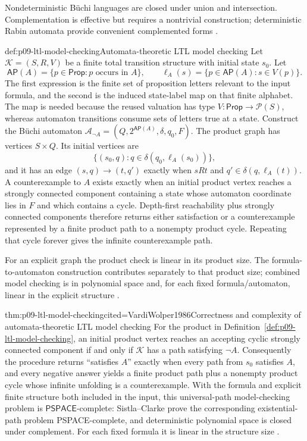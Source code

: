Nondeterministic B\"uchi languages are closed under union and intersection.
Complementation is effective but requires a nontrivial construction;
deterministic Rabin automata provide convenient complemented forms
\cite{Safra1995Extended,Thomas1996Report}.

\begin{hbmethod}{def:p09-ltl-model-checking}{Automata-theoretic LTL model checking}
Let \(\mathcal K=(S,R,V)\) be a finite total transition structure with initial
state \(s_0\).  Let
\[
 \mathsf{AP}(A)=\{p\in\mathsf{Prop}:p\text{ occurs in }A\},
 \qquad
 \ell_A(s)=\{p\in\mathsf{AP}(A):s\in V(p)\}.
\]
The first expression is the finite set of proposition letters relevant to the
input formula, and the second is the induced state-label map on that finite
alphabet.  The map is needed because the reused valuation has type
\(V:\mathsf{Prop}\to\mathcal P(S)\), whereas automaton transitions consume
sets of letters true at a state.  Construct the B\"uchi automaton
\(\mathcal A_{\neg A}=(Q,2^{\mathsf{AP}(A)},\delta,q_0,F)\).
The product graph has vertices \(S\times Q\).  Its initial vertices are
\[
 \{(s_0,q):q\in\delta(q_0,\ell_A(s_0))\},
\]
and it has an edge
\((s,q)\to(t,q')\) exactly when \(sRt\) and
\(q'\in\delta(q,\ell_A(t))\).  A counterexample to \(A\) exists exactly when an
initial product vertex reaches a strongly connected component containing a
state whose automaton coordinate lies in \(F\) and which contains a cycle.
Depth-first reachability plus strongly connected components therefore returns
either satisfaction or a counterexample represented by a finite product path
to a nonempty product cycle.  Repeating that cycle forever gives the infinite
counterexample path.

For an explicit graph the product check is linear in its product size.  The
formula-to-automaton construction contributes separately to that product size;
combined model checking is in polynomial space and, for each fixed
formula/automaton, linear in the explicit structure
\cite{VardiWolper1986,SistlaClarke1985}.
\end{hbmethod}

\begin{hbtheorem}{thm:p09-ltl-model-checking}{cited=VardiWolper1986}{Correctness and complexity of automata-theoretic LTL model checking}
For the product in Definition~\ref{def:p09-ltl-model-checking}, an initial
product vertex reaches an accepting cyclic strongly connected component if
and only if \(\mathcal K\) has a path satisfying \(\neg A\).  Consequently the
procedure returns ``satisfies \(A\)'' exactly when every path from \(s_0\)
satisfies \(A\), and every negative answer yields a finite product path plus a
nonempty product cycle whose infinite unfolding is a counterexample.  With the
formula and explicit finite structure both included
in the input, this universal-path model-checking problem is
\(\mathsf{PSPACE}\)-complete: Sistla--Clarke prove the corresponding
existential-path problem PSPACE-complete, and deterministic polynomial space
is closed under complement.  For each fixed formula it is linear in the
structure size \cite{VardiWolper1986,SistlaClarke1985}.
\end{hbtheorem}

